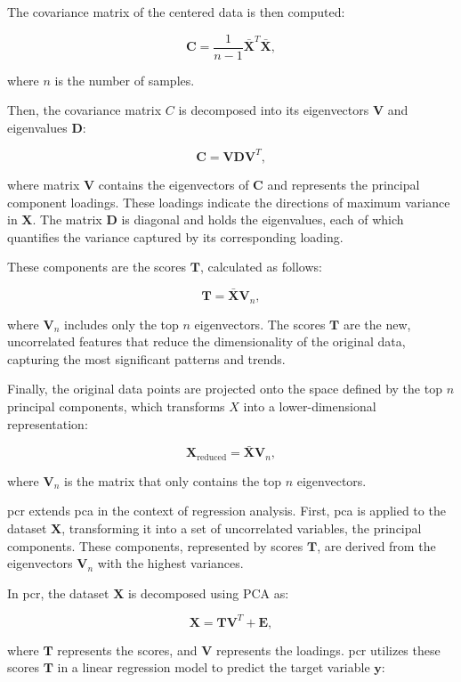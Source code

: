 The covariance matrix of the centered data is then computed:

$$
\mathbf{C} = \frac{1}{n-1} \mathbf{\bar{X}}^T \mathbf{\bar{X}},
$$

where $n$ is the number of samples.

Then, the covariance matrix $C$ is decomposed into its eigenvectors $\mathbf{V}$ and eigenvalues $\mathbf{D}$:

$$
\mathbf{C} = \mathbf{V} \mathbf{D} \mathbf{V}^T,
$$

where matrix $\mathbf{V}$ contains the eigenvectors of $\mathbf{C}$ and represents the principal component loadings.
These loadings indicate the directions of maximum variance in $\mathbf{X}$.
The matrix $\mathbf{D}$ is diagonal and holds the eigenvalues, each of which quantifies the variance captured by its corresponding loading.

These components are the scores $\mathbf{T}$, calculated as follows:

$$
\mathbf{T} = \mathbf{\bar{X}} \mathbf{V}_n,
$$

where $\mathbf{V}_n$ includes only the top $n$ eigenvectors.
The scores $\mathbf{T}$ are the new, uncorrelated features that reduce the dimensionality of the original data, capturing the most significant patterns and trends.

Finally, the original data points are projected onto the space defined by the top $n$ principal components, which transforms $X$ into a lower-dimensional representation:

$$
\mathbf{X}_{\text{reduced}} = \mathbf{\bar{X}} \mathbf{V}_n,
$$

where $\mathbf{V}_n$ is the matrix that only contains the top $n$ eigenvectors.

\gls{pcr} extends \gls{pca} in the context of regression analysis.
First, \gls{pca} is applied to the dataset $\mathbf{X}$, transforming it into a set of uncorrelated variables, the principal components.
These components, represented by scores $\mathbf{T}$, are derived from the eigenvectors $\mathbf{V}_n$ with the highest variances.

In \gls{pcr}, the dataset $\mathbf{X}$ is decomposed using PCA as:

$$
\mathbf{X} = \mathbf{TV}^T + \mathbf{E},
$$

where $\mathbf{T}$ represents the scores, and $\mathbf{V}$ represents the loadings.
\gls{pcr} utilizes these scores $\mathbf{T}$ in a linear regression model to predict the target variable $\mathbf{y}$:

